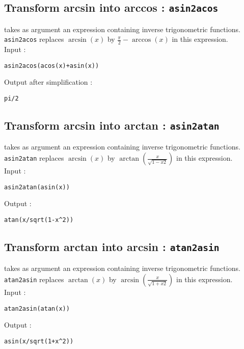 \documentclass[a4paper,11pt]{book}
\begin{document}
\subsection{Transform arcsin into arccos : {\tt asin2acos}}
 takes as argument an 
expression containing inverse trigonometric functions.\\
{\tt asin2acos} replaces $\arcsin(x)$  by
$\displaystyle \frac{\pi}{2}-\arccos(x)$ in this expression.\\
Input :
\begin{center}{\tt asin2acos(acos(x)+asin(x))}\end{center}
Output after simplification :
\begin{center}{\tt pi/2}\end{center}

\subsection{Transform arcsin into arctan : {\tt asin2atan}}
 takes as argument an expression containing 
inverse trigonometric functions.\\
{\tt asin2atan} replaces $\arcsin(x)$  by 
$\displaystyle \arctan(\frac{x}{\sqrt{1-x2}})$ in this expression.\\
Input :
\begin{center}{\tt asin2atan(asin(x))}\end{center}
Output :
\begin{center}{\tt atan(x/sqrt(1-x\verb|^|2))}\end{center}

\subsection{Transform arctan into arcsin : {\tt atan2asin}}
 takes as argument an expression
containing inverse trigonometric functions.
{\tt atan2asin} replaces $\arctan(x)$ by 
$\displaystyle \arcsin(\frac{x}{\sqrt{1+x2}})$ in this expression.\\
Input :
\begin{center}{\tt atan2asin(atan(x))}\end{center}
Output :
\begin{center}{\tt asin(x/sqrt(1+x\verb|^|2))}\end{center}
\end{document}
